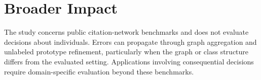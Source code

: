 \section*{Broader Impact}
The study concerns public citation-network benchmarks and does not evaluate decisions about individuals. Errors can propagate through graph aggregation and unlabeled prototype refinement, particularly when the graph or class structure differs from the evaluated setting. Applications involving consequential decisions require domain-specific evaluation beyond these benchmarks.
